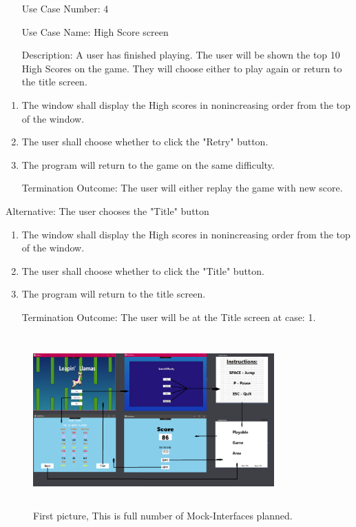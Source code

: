 \documentclass[10pt,conference,onecolumn,compsoc]{IEEEtran}
\begin{document}
\begin{itemize}
\item[Use Case Number:] 4
\item[Use Case Name:] High Score screen
\item[Description:] A user has finished playing. The user will be shown the top 10 High Scores on the game. They will choose either to play again or return to the title screen.

\end{itemize}

\begin{enumerate}
\item The window shall display the High scores in nonincreasing order from the top of the window.
\item The user shall choose whether to click the "Retry" button.
\item The program will return to the game on the same difficulty.
\item[Termination Outcome:] The user will either replay the game with new score.
\end{enumerate}

Alternative: The user chooses the "Title" button
\begin{enumerate}
\item The window shall display the High scores in nonincreasing order from the top of the window.
\item The user shall choose whether to click the "Title" button.
\item The program will return to the title screen.
\item[Termination Outcome:] The user will be at the Title screen at case: 1. 
\end{enumerate}

\begin{figure}[ht!]
\includegraphics[height=250px, width=350px]{Mockup.png}
\caption{First picture, This is full number of Mock-Interfaces planned.}
\label{fig:mockup}
\end{figure}
\end{document}
